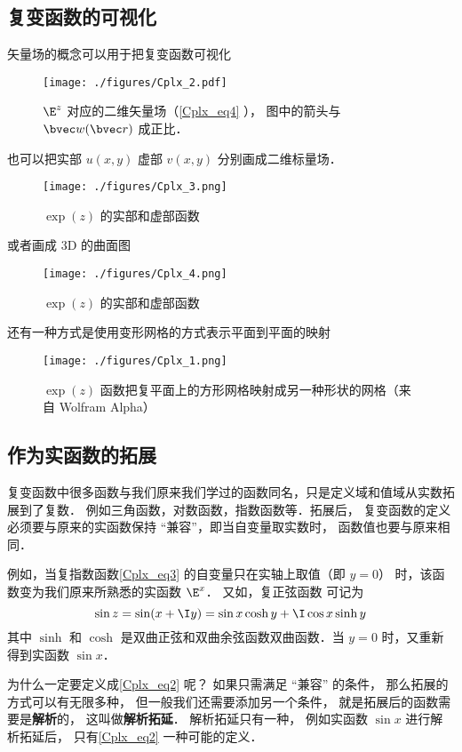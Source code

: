 \subsection{复变函数的可视化}
矢量场的概念可以用于把复变函数可视化
\begin{figure}[ht]
\centering
\texttt{[image: ./figures/Cplx\_2.pdf]}
\caption{$\E^z$ 对应的二维矢量场（\autoref{Cplx_eq4} ）， 图中的箭头与 $\bvec w(\bvec r)$ 成正比．} \label{Cplx_fig2}
\end{figure}
也可以把实部 $u(x,y)$ 虚部 $v(x, y)$ 分别画成二维标量场．
\begin{figure}[ht]
\centering
\texttt{[image: ./figures/Cplx\_3.png]}
\caption{$\exp(z)$ 的实部和虚部函数} \label{Cplx_fig3}
\end{figure}
或者画成 3D 的曲面图
\begin{figure}[ht]
\centering
\texttt{[image: ./figures/Cplx\_4.png]}
\caption{$\exp(z)$ 的实部和虚部函数} \label{Cplx_fig4}
\end{figure}

还有一种方式是使用变形网格的方式表示平面到平面的映射
\begin{figure}[ht]
\centering
\texttt{[image: ./figures/Cplx\_1.png]}
\caption{$\exp(z)$ 函数把复平面上的方形网格映射成另一种形状的网格（来自 Wolfram Alpha）} \label{Cplx_fig1}
\end{figure}

\subsection{作为实函数的拓展}
复变函数中很多函数与我们原来我们学过的函数同名，只是定义域和值域从实数拓展到了复数． 例如三角函数，对数函数，指数函数等．拓展后， 复变函数的定义必须要与原来的实函数保持 “兼容”，即当自变量取实数时， 函数值也要与原来相同．

例如，当复指数函数\autoref{Cplx_eq3} 的自变量只在实轴上取值（即 $y = 0$） 时，该函数变为我们原来所熟悉的实函数 $\E^x$．  又如，复正弦函数 可记为
\begin{equation}\label{Cplx_eq2}
\sin z = \sin(x + \I y) = \sin x\cosh y + \I\cos x\sinh y
\end{equation}
其中 $\sinh $ 和 $\cosh $ 是双曲正弦和双曲余弦函数双曲函数．当 $y = 0$ 时，又重新得到实函数 $\sin x$．

为什么一定要定义成\autoref{Cplx_eq2} 呢？ 如果只需满足 “兼容” 的条件， 那么拓展的方式可以有无限多种， 但一般我们还需要添加另一个条件， 就是拓展后的函数需要是\textbf{解析}的， 这叫做\textbf{解析拓延}． %
解析拓延只有一种， 例如实函数 $\sin x$ 进行解析拓延后， 只有\autoref{Cplx_eq2} 一种可能的定义．

